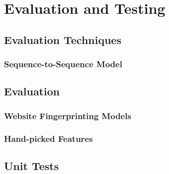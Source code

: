\section{Evaluation and Testing}

\subsection{Evaluation Techniques}

\subsubsection{Sequence-to-Sequence Model}

\subsection{Evaluation}


\subsubsection{Website Fingerprinting Models}



\subsubsection{Hand-picked Features}



\subsection{Unit Tests}
